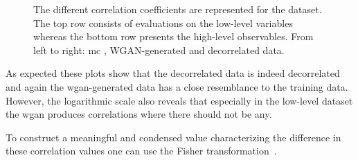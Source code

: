 \begin{figure}
    \begin{minipage}{0.9\textwidth}
        \centering
        \begin{minipage}{0.3\textwidth}
        \end{minipage}
        \begin{minipage}{0.3\textwidth}
        \end{minipage}
        \begin{minipage}{0.3\textwidth}
        \end{minipage}

        \begin{minipage}{0.3\textwidth}
        \end{minipage}
        \begin{minipage}{0.3\textwidth}
        \end{minipage}
        \begin{minipage}{0.3\textwidth}
        \end{minipage}
    \end{minipage}
    \begin{minipage}{0.07\textwidth}
    \end{minipage}

    \caption{The different correlation coefficients are represented for the \signal{} dataset. The top row consists of evaluations on the low-level variables whereas the bottom row presents the high-level observables. From left to right: \gls{mc} \signal{}, WGAN-generated and decorrelated data. }\label{fig:correlation-matrix}
\end{figure}

As expected these plots show that the decorrelated data is indeed decorrelated and again the \gls{wgan}-generated data has a close resemblance to the training data. However, the logarithmic scale also reveals that especially in the low-level dataset the \gls{wgan} produces correlations where there should not be any.

To construct a meaningful and condensed value characterizing the difference in these correlation values one can use the Fisher transformation~\cite{fisher-trafo}.

